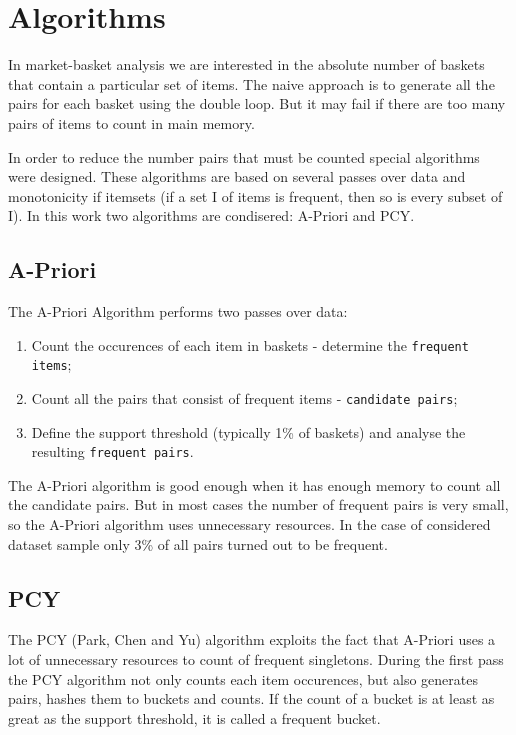 % 
% 
\chapter{Algorithms}
\label{chap:algorithms}

In market-basket analysis we are interested in the absolute number of baskets that contain a particular set of items.
The naive approach is to generate all the pairs for each basket using the double loop. But it may fail if there are too many pairs of items to count in main memory. 

In order to reduce the number pairs that must be counted special algorithms were designed. These algorithms are based on several passes over data and monotonicity if itemsets (if a set I of items is frequent, then so is every subset of I). 
In this work two algorithms are condisered: A-Priori and PCY.


\section{A-Priori}
The A-Priori Algorithm performs two passes over data:
\begin{enumerate}
	\item Count the occurences of each item in baskets - determine the \texttt{frequent items}; 
	\item Count all the pairs that consist of frequent items - \texttt{candidate pairs}; 
	\item Define the support threshold (typically 1\% of baskets) and analyse the resulting \texttt{frequent pairs}.
\end{enumerate}


The A-Priori algorithm is good enough when it has enough memory to count all the candidate pairs.
But in most cases the number of frequent pairs is very small, so the A-Priori algorithm uses unnecessary resources. In the case of considered dataset sample only 3\% of all pairs turned out to be frequent.


\section{PCY}
The PCY (Park, Chen and Yu) algorithm exploits the fact that A-Priori uses a lot of unnecessary resources to count of frequent singletons.
During the first pass the PCY algorithm not only counts each item occurences, but also generates pairs, hashes them to buckets and counts.
If the count of a bucket is at least as great as the support threshold, it is called a frequent bucket.

